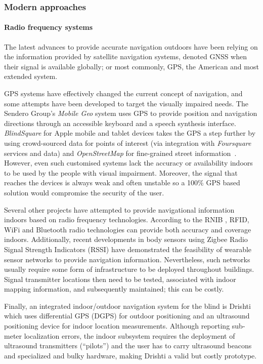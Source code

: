 \subsubsection{Modern approaches}
\label{sec:modernapproaches}
\paragraph{Radio frequency systems}

The latest advances to provide accurate navigation outdoors have been relying on the information provided by satellite navigation systems, denoted GNSS when their signal is available globally; or most commonly, GPS, the American and most extended system.

GPS systems have effectively changed the current concept of navigation, and some attempts have been developed to target the visually impaired needs. The Sendero Group's {\it Mobile Geo} \citep{senderoSeeingEye} system uses GPS to provide position and navigation directions through an accessible keyboard and a speech synthesis interface. {\it BlindSquare} for Apple mobile and tablet devices takes the GPS a step further by using crowd-sourced data for points of interest (via integration with {\it Foursquare} services and data) and {\it OpenStreetMap} for fine-grained street information~\citep{blindSquare}. However, even such customised systems lack the accuracy or availability indoors to be used by the people with visual impairment. Moreover, the signal that reaches the devices is always weak and often unstable so a 100\% GPS based solution would compromise the security of the user.

Several other projects have attempted to provide navigational information indoors based on radio frequency technologies. According to the RNIB \citep{Worsfold2010}, RFID, WiFi and Bluetooth radio technologies can provide both accuracy and coverage indoors. Additionally, recent developments in body sensors using Zigbee Radio Signal Strength Indicators (RSSI) \citep{dong2012mapping} have demonstrated the feasibility of wearable sensor networks to provide navigation information. Nevertheless, such networks usually require some form of infrastructure to be deployed throughout buildings. Signal transmitter locations then need to be tested, associated with indoor mapping information, and subsequently maintained; this can be costly.

Finally, an integrated indoor/outdoor navigation system for the blind is Drishti \citep{ran2004drishti} which uses differential GPS (DGPS) for outdoor positioning and an ultrasound positioning device for indoor location measurements. Although reporting sub-meter localization errors, the indoor subsystem requires the deployment of ultrasound transmitters (``pilots'') and the user has to carry ultrasound beacons and specialized and bulky hardware, making Drishti a valid but costly prototype.

